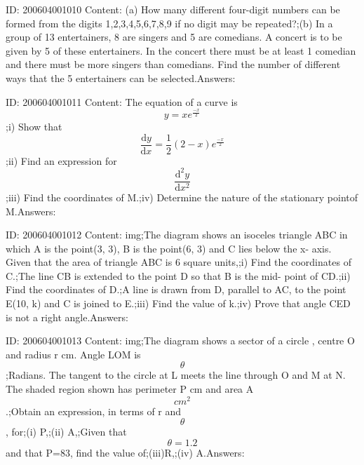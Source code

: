 \documentclass{article}
\begin{document}
ID: 200604001010
Content:
(a)	How many different four-digit numbers can be formed from the digits 1,2,3,4,5,6,7,8,9 if no digit may be repeated?;(b)	In a group of 13 entertainers, 8 are singers and 5 are comedians. A concert is to be given by 5 of these entertainers. In the concert there must be at least 1 comedian and there must be more singers than comedians. Find the number of different ways that the 5 entertainers can be selected.Answers:

ID: 200604001011
Content:
The equation of a curve is $$y=xe^{\frac{-x}{2}}$$;i) Show that $$\frac{\mathrm{d} y}{\mathrm{d} x}=\frac{1}{2} (2-x)e^{\frac{-x}{2}}$$;ii) Find an expression for $$\frac{\mathrm{d} ^{2}y}{\mathrm{d} x^{2}}$$;iii) Find the coordinates of M.;iv) Determine the nature of the stationary pointof M.Answers:

ID: 200604001012
Content:
img;The diagram shows an isoceles triangle ABC in which A is the point(3, 3), B is the point(6, 3) and C lies below the x- axis. Given that the area of triangle ABC is 6 square units,;i) Find the coordinates of C.;The line CB is extended to the point D so that B is the mid- point of CD.;ii) Find the coordinates of D.;A line is drawn from D, parallel to AC, to the point E(10, k) and C is joined to E.;iii) Find the value of k.;iv) Prove that angle CED is not a right angle.Answers:

ID: 200604001013
Content:
img;The diagram shows a sector of a circle , centre O and radius r cm. Angle LOM is $$\theta$$;Radians. The tangent to the circle at L meets the line through O and M at N. The shaded region shown has perimeter P cm and area A$$cm^2$$.;Obtain an expression, in terms of r and $$\theta$$, for;(i) P,;(ii)	A,;Given that $$\theta=1.2$$ and that P=83, find the value of;(iii)R,;(iv)	A.Answers:
\end{document}
